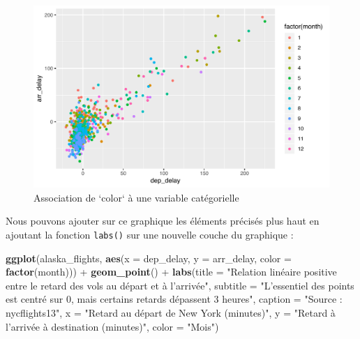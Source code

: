 \documentclass[a4paperpaper,]{article}
\newenvironment{Shaded}{\begin{snugshade}}{\end{snugshade}}
\newcommand{\DataTypeTok}[1]{\textcolor[rgb]{0.00,0.34,0.68}{#1}}
\newcommand{\KeywordTok}[1]{\textcolor[rgb]{0.12,0.11,0.11}{\textbf{#1}}}
\newcommand{\NormalTok}[1]{\textcolor[rgb]{0.12,0.11,0.11}{#1}}
\newcommand{\OperatorTok}[1]{\textcolor[rgb]{0.12,0.11,0.11}{#1}}
\newcommand{\StringTok}[1]{\textcolor[rgb]{0.75,0.01,0.01}{#1}}
\theoremstyle{definition}
\theoremstyle{definition}
\theoremstyle{definition}
\theoremstyle{remark}
\begin{document}
\begin{figure}[htpb]

{\centering \includegraphics[width=0.9\linewidth]{figure/varcolorlabel-1} 

}

\caption{Association de `color` à une variable catégorielle}\label{fig:varcolorlabel}
\end{figure}

Nous pouvons ajouter sur ce graphique les éléments précisés plus haut en
ajoutant la fonction \texttt{labs()} sur une nouvelle couche du
graphique :

\begin{Shaded}
\begin{Highlighting}[]
\KeywordTok{ggplot}\NormalTok{(alaska_flights, }\KeywordTok{aes}\NormalTok{(}\DataTypeTok{x =}\NormalTok{ dep_delay, }\DataTypeTok{y =}\NormalTok{ arr_delay, }\DataTypeTok{color =} \KeywordTok{factor}\NormalTok{(month))) }\OperatorTok{+}
\StringTok{  }\KeywordTok{geom_point}\NormalTok{() }\OperatorTok{+}
\StringTok{  }\KeywordTok{labs}\NormalTok{(}\DataTypeTok{title =} \StringTok{"Relation linéaire positive entre le retard des vols au départ et à l'arrivée"}\NormalTok{,}
       \DataTypeTok{subtitle =} \StringTok{"L'essentiel des points est centré sur 0, mais certains retards dépassent 3 heures"}\NormalTok{,}
       \DataTypeTok{caption =} \StringTok{"Source : nycflights13"}\NormalTok{,}
       \DataTypeTok{x =} \StringTok{"Retard au départ de New York (minutes)"}\NormalTok{,}
       \DataTypeTok{y =} \StringTok{"Retard à l'arrivée à destination (minutes)"}\NormalTok{,}
       \DataTypeTok{color =} \StringTok{"Mois"}\NormalTok{)}
\end{Highlighting}
\end{Shaded}
\end{document}
